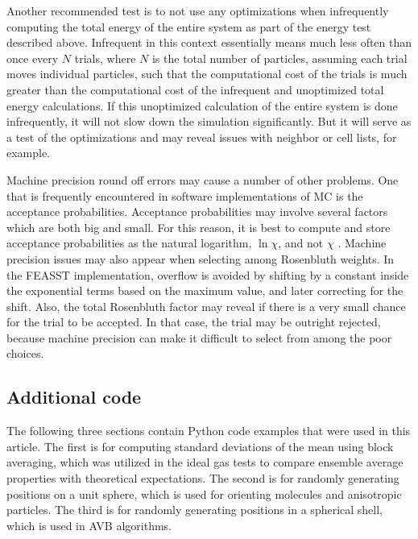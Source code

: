 \documentclass[
  9pt,
  bestpractices,
  pubversion,
]{livecoms}
\begin{document}
Another recommended test is to not use any optimizations when infrequently computing the total energy of the entire system as part of the energy test described above.
Infrequent in this context essentially means much less often than once every $N$ trials, where $N$ is the total number of particles, assuming each trial moves individual particles, such that the computational cost of the trials is much greater than the computational cost of the infrequent and unoptimized total energy calculations.
If this unoptimized calculation of the entire system is done infrequently, it will not slow down the simulation significantly.
But it will serve as a test of the optimizations and may reveal issues with neighbor or cell lists, for example.

Machine precision round off errors may cause a number of other problems.
One that is frequently encountered in software implementations of MC is the acceptance probabilities.
Acceptance probabilities may involve several factors which are both big and small.
For this reason, it is best to compute and store acceptance probabilities as the natural logarithm, $\ln\chi$, and not $\chi$ \cite{shah_cassandra_2017}.
Machine precision issues may also appear when selecting among Rosenbluth weights.
In the FEASST \cite{hatch_monte_2024} implementation, overflow is avoided by shifting by a constant inside the exponential terms based on the maximum value, and later correcting for the shift.
Also, the total Rosenbluth factor may reveal if there is a very small chance for the trial to be accepted.
In that case, the trial may be outright rejected, because machine precision can make it difficult to select from among the poor choices.

\subsection{\label{sec:code}Additional code}

The following three sections contain Python code examples that were used in this article.
The first is for computing standard deviations of the mean using block averaging, which was utilized in the ideal gas tests to compare ensemble average properties with theoretical expectations.
The second is for randomly generating positions on a unit sphere, which is used for orienting molecules and anisotropic particles.
The third is for randomly generating positions in a spherical shell, which is used in AVB algorithms.
\end{document}
